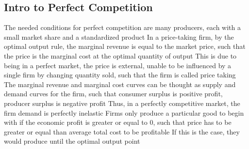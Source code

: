 \documentclass[11 pt, twoside]{article}
\newenvironment{outline*}
{
	\begin{outline}[enumerate]
	}
	{\end{outline}
}
\begin{document}
\subsection{Intro to Perfect Competition}
\begin{outline*}
\1 The needed conditions for perfect competition are many producers, each with a small market share and a standardized product
\1 In a price-taking firm, by the optimal output rule, the marginal revenue is equal to the market price, such that the price is the marginal cost at the optimal quantity of output
\2 This is due to being in a perfect market, the price is external, unable to be influenced by a single firm by changing quantity sold, such that the firm is called price taking
\1 The marginal revenue and marginal cost curves can be thought as supply and demand curves for the firm, such that consumer surplus is positive profit, producer surplus is negative profit
\2 Thus, in a perfectly competitive market, the firm demand is perfectly inelastic
\1 Firms only produce a particular good to begin with if the economic profit is greater or equal to 0, such that price has to be greater or equal than average total cost to be profitable
\2 If this is the case, they would produce until the optimal output point
\end{outline*}
\end{document}
